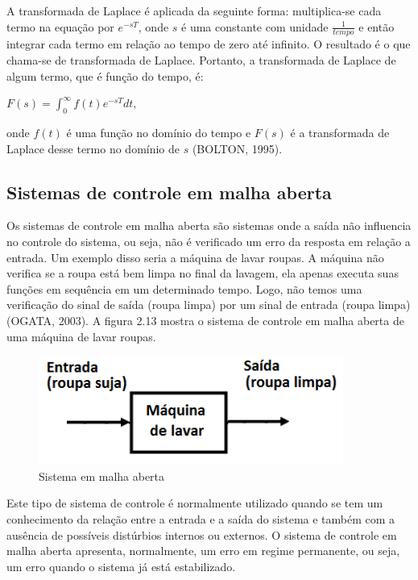 A transformada de Laplace é aplicada da seguinte forma: multiplica-se cada termo na equação por $e^{-sT}$, onde $s$ é uma  constante com unidade $ \frac {1}{tempo}$  e então integrar cada termo em relação ao tempo de zero até infinito. O resultado é o que chama-se de transformada de Laplace. Portanto, a transformada de Laplace de algum termo, que é função do tempo, é:

\begin{center} 
$F(s) = \int_0^\infty f(t) e^{-sT} dt,$
\end{center}

onde $f(t)$ é uma função no domínio do tempo e $F(s)$ é a transformada de Laplace desse termo no domínio de $s$ (BOLTON, 1995).

\subsection{Sistemas de controle em malha aberta}

Os sistemas de controle em malha aberta são sistemas onde a saída não influencia no controle do sistema, ou seja, não é verificado um erro da resposta em relação a entrada. Um exemplo disso seria a máquina de lavar roupas. A máquina não verifica se a roupa está bem limpa no final da lavagem, ela apenas executa suas funções em sequência em um determinado tempo. Logo, não temos uma verificação do sinal de saída (roupa limpa) por um sinal de entrada (roupa limpa) (OGATA, 2003). A figura 2.13 mostra o sistema de controle em malha aberta de uma máquina de lavar roupas.

\begin{figure}[!htb]

\center

\includegraphics[width=10cm]{imagens/malha_aberta.png}

\label{Sistema em malha aberta}

\caption{Sistema em malha aberta}

\end{figure}


Este tipo de sistema de controle é normalmente utilizado quando se tem um conhecimento da relação entre a entrada e a saída do sistema e também com a ausência de possíveis distúrbios internos ou externos. O sistema de controle em malha aberta apresenta, normalmente, um erro em regime permanente, ou seja, um erro quando o sistema já está estabilizado.

